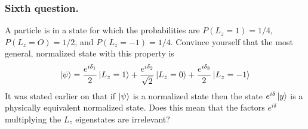 \documentclass[../../../main.tex]{subfiles}
\begin{document}
\subsubsection{Sixth question.}
A particle is in a state for which the probabilities are $P(L_z=1)=1/4$, $P(L_z=O)=1/2$, and $P(L_z =-1)= 1 /4$. 
Convince yourself that the most general, normalized state with this property is
\begin{equation*}
    \ket{\psi}=\frac{e^{i\delta_1 }}{2 }\ket{L_z=1}+\frac{e^{i \delta_2 }}{\sqrt{2 }}\ket{L_z=0}+\frac{e^{i \delta_3 }}{2}\ket{L_z=-1}
\end{equation*}
It was stated earlier on that if $\ket{\psi}$ is a normalized state then the state $e^{i\delta}\ket{y}$ is a physically equivalent normalized state. 
Does this mean that the factors $e^{i\delta}$ multiplying the $L_z$ eigenstates are irrelevant?
\end{document}
